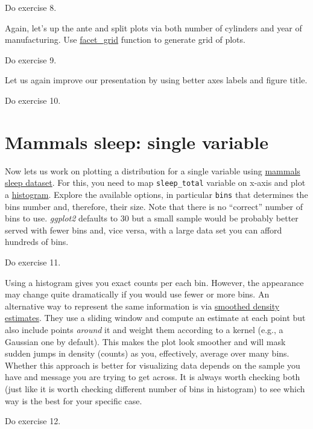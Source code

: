\documentclass[
]{book}
\begin{document}
Do exercise 8.

Again, let's up the ante and split plots via both number of cylinders and year of manufacturing. Use \href{https://ggplot2.tidyverse.org/reference/facet_grid.html}{facet\_grid} function to generate grid of plots.

Do exercise 9.

Let us again improve our presentation by using better axes labels and figure title.

Do exercise 10.

\hypertarget{mammals-sleep-single-variable}{%
\section{Mammals sleep: single variable}\label{mammals-sleep-single-variable}}

Now lets us work on plotting a distribution for a single variable using \href{https://ggplot2.tidyverse.org/reference/msleep.html}{mammals sleep dataset}. For this, you need to map \texttt{sleep\_total} variable on x-axis and plot a \href{https://ggplot2.tidyverse.org/reference/geom_histogram.html}{histogram}. Explore the available options, in particular \texttt{bins} that determines the bins number and, therefore, their size. Note that there is no ``correct'' number of bins to use. \emph{ggplot2} defaults to 30 but a small sample would be probably better served with fewer bins and, vice versa, with a large data set you can afford hundreds of bins.

Do exercise 11.

Using a histogram gives you exact counts per each bin. However, the appearance may change quite dramatically if you would use fewer or more bins. An alternative way to represent the same information is via \href{https://ggplot2.tidyverse.org/reference/geom_density.html}{smoothed density estimates}. They use a sliding window and compute an estimate at each point but also include points \emph{around} it and weight them according to a kernel (e.g., a Gaussian one by default). This makes the plot look smoother and will mask sudden jumps in density (counts) as you, effectively, average over many bins. Whether this approach is better for visualizing data depends on the sample you have and message you are trying to get across. It is always worth checking both (just like it is worth checking different number of bins in histogram) to see which way is the best for your specific case.

Do exercise 12.
\end{document}
